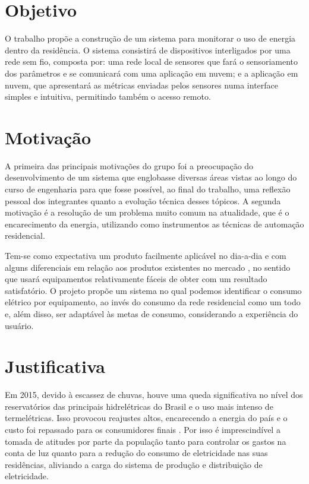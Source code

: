 \label{Cap:Introducao}

\section{Objetivo}
\label{Sec:objetivo}

O trabalho propõe a construção de um sistema para monitorar o uso de energia dentro da residência. O sistema consistirá  de dispositivos interligados por uma rede sem fio, composta por: uma rede local de sensores  que fará o sensoriamento dos parâmetros e se comunicará com uma aplicação em nuvem; e a aplicação em nuvem, que apresentará as métricas enviadas pelos sensores numa interface simples e intuitiva, permitindo também o acesso remoto. 

\section{Motivação}
\label{Sec:motivacao}

A primeira das principais motivações do grupo foi a preocupação do desenvolvimento de um sistema que englobasse diversas áreas vistas ao longo do curso de engenharia para que fosse possível, ao final do trabalho, uma reflexão pessoal dos integrantes quanto a evolução técnica desses tópicos. A segunda motivação é a resolução de um problema muito comum na atualidade, que é o encarecimento da energia,  utilizando como instrumentos as técnicas de automação residencial.

Tem-se como expectativa um produto facilmente aplicável no dia-a-dia e com alguns diferenciais em relação aos produtos existentes no mercado \cite{green_ant_site} \cite{neurio_site} \cite{emonpi_site} \cite{ecoisme_site}, no sentido que usará equipamentos relativamente fáceis de obter com um resultado satisfatório. O projeto propõe um sistema no qual podemos identificar o consumo elétrico por equipamento, ao invés do consumo da rede residencial como um todo e, além disso, ser adaptável às metas de consumo, considerando a experiência do usuário.

\section{Justificativa}
\label{Sec:justificativa}

Em 2015, devido à escassez de chuvas, houve uma queda significativa no nível dos reservatórios das principais hidrelétricas do Brasil e o uso mais intenso de termelétricas. Isso provocou reajustes altos, encarecendo a energia do país e o custo foi repassado para os consumidores finais \cite{news_g1, news_secretaria_de_energia}. Por isso é imprescindível a tomada de atitudes por parte da população tanto para controlar os gastos na conta de luz quanto para a redução do consumo de eletricidade nas suas residências,  aliviando a carga do sistema de produção e distribuição de eletricidade.

